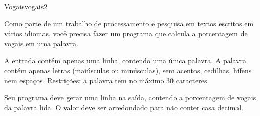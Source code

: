 \documentclass[12pt,a4paper,oneside]{article}
\begin{document}
\begin{problem}{Vogais}{vogais}{2}
 
Como parte de um trabalho de processamento e pesquisa em textos escritos em vários idiomas, você precisa fazer um programa que calcula a porcentagem de vogais em uma palavra.

%

\InputFile

A entrada contém apenas uma linha, contendo uma única palavra. A palavra contém apenas letras (maiúsculas ou minúsculas), sem acentos, cedilhas, hífens nem espaços. Restrições: a palavra tem no máximo 30 caracteres.

\OutputFile

Seu programa deve gerar uma linha na saída, contendo a porcentagem de vogais da palavra lida. O valor deve ser arredondado para não conter casa decimal.


\Example

\begin{example}
%
\end{example}

\begin{example}
%
\end{example}

\begin{example}
%
\end{example}

\begin{example}
%
\end{example}



\end{problem}
\end{document}
